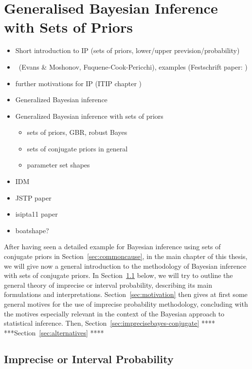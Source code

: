 \chapter{Generalised Bayesian Inference with Sets of Priors}
\label{cha:gbi}

\begin{itemize}
\item Short introduction to IP (sets of priors, lower/upper prevision/probability)
\item \pdc\ (Evans \& Moshonov, Fuquene-Cook-Pericchi), examples (Festschrift paper: \cite{Walter2010a})
\item further motivations for IP (ITIP chapter \cite{itip-statinf}) 
\item Generalized Bayesian inference
\item Generalized Bayesian inference with sets of priors
 \begin{itemize}
 \item sets of priors, GBR, robust Bayes
 \item sets of conjugate priors in general
 \item parameter set shapes
 \end{itemize}
\item IDM
\item JSTP paper \cite{Walter2009a}
\item isipta11 paper \cite{Walter2011a}
\item boatshape?
\end{itemize}



After having seen a detailed example for Bayesian inference using sets of conjugate priors in Section~\ref{sec:commoncause},
in the main chapter of this thesis,
we will give now a general introduction to the methodology of Bayesian inference with sets of conjugate priors.
In Section~\ref{sec:ip-intro} below, we will try to outline the general theory of imprecise or interval probability,
describing its main formulations and interpretations.
Section~\ref{sec:motivation} then gives at first some general motives for the use of imprecise probability methodology,
concluding with the motives especially relevant in the context of the Bayesian approach to statistical inference.
Then, Section~\ref{sec:imprecisebayes-conjugate} ****
***Section~\ref{sec:alternatives} ****


\section{Imprecise or Interval Probability}
\label{sec:ip-intro}

